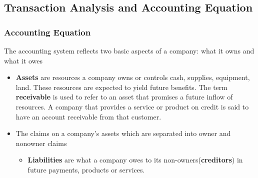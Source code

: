 \documentclass[../main.tex]{subfiles}
\begin{document}
	\subsection{Transaction Analysis and Accounting Equation}
	
	\subsubsection{Accounting Equation}
	
	The accounting system reflects two basic aspects of a company: what it owns 
	and what it owes \ie 
	\begin{itemize}[noitemsep]
		\item \textbf{Assets} are resources a company owns or controls \eg 
		cash, supplies, equipment, land. These resources are expected to yield 
		future benefits. The term \textbf{receivable} is used to refer to an 
		asset that promises a future inflow of resources. A company that 
		provides a service or product on credit is said to have an account 
		receivable from that customer. 
		\item The claims on a company's assets which are separated into owner 
		and nonowner claims \ie
		\begin{itemize}[noitemsep]
			\item \textbf{Liabilities} are what a company owes to its 
			non-owners(\textbf{creditors}) in future payments, products or 
			services. 
			

\end{itemize}
\end{itemize}
\end{document}
